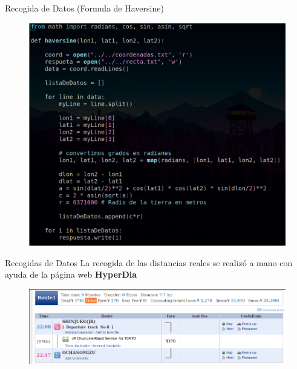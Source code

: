 \documentclass{beamer}
\begin{document}
\begin{frame}{Recogida de Datos (Formula de Haversine)}
  \begin{figure}[H]
    \centering
    \includegraphics[scale=0.20]{"../pics/haversine"}
  \end{figure}
\end{frame}

\begin{frame}{Recogidas de Datos}
    La recogida de las distancias reales se realizó a mano con ayuda de la página web \textbf{HyperDia}
    \vspace{0.5cm}
    \begin{figure}[H]
      \centering
      \includegraphics[scale=0.30]{"../pics/hyperDia"}
    \end{figure}
\end{frame}
\end{document}
